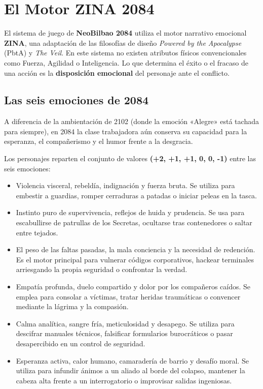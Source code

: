 \chapter{El Motor ZINA 2084}

El sistema de juego de \textbf{NeoBilbao 2084} utiliza el motor narrativo emocional \textbf{ZINA}, una adaptación de las filosofías de diseño \emph{Powered by the Apocalypse} (PbtA) y \emph{The Veil}. En este sistema no existen atributos físicos convencionales como Fuerza, Agilidad o Inteligencia. Lo que determina el éxito o el fracaso de una acción es la \textbf{disposición emocional} del personaje ante el conflicto.

\section{Las seis emociones de 2084}

A diferencia de la ambientación de 2102 (donde la emoción «Alegre» está tachada para siempre), en 2084 la clase trabajadora aún conserva su capacidad para la esperanza, el compañerismo y el humor frente a la desgracia.

Los personajes reparten el conjunto de valores \textbf{(+2, +1, +1, 0, 0, -1)} entre las seis emociones:

\begin{itemize}
  \item {} Violencia visceral, rebeldía, indignación y fuerza bruta. Se utiliza para embestir a guardias, romper cerraduras a patadas o iniciar peleas en la tasca.
  \item {} Instinto puro de supervivencia, reflejos de huida y prudencia. Se usa para escabullirse de patrullas de los Secretas, ocultarse tras contenedores o saltar entre tejados.
  \item {} El peso de las faltas pasadas, la mala conciencia y la necesidad de redención. Es el motor principal para vulnerar códigos corporativos, hackear terminales arriesgando la propia seguridad o confrontar la verdad.
  \item {} Empatía profunda, duelo compartido y dolor por los compañeros caídos. Se emplea para consolar a víctimas, tratar heridas traumáticas o convencer mediante la lágrima y la compasión.
  \item {} Calma analítica, sangre fría, meticulosidad y desapego. Se utiliza para descifrar manuales técnicos, falsificar formularios burocráticos o pasar desapercibido en un control de seguridad.
  \item {} Esperanza activa, calor humano, camaradería de barrio y desafío moral. Se utiliza para infundir ánimos a un aliado al borde del colapso, mantener la cabeza alta frente a un interrogatorio o improvisar salidas ingeniosas.
\end{itemize}

